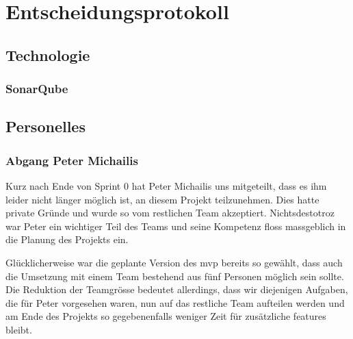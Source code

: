 \documentclass[../main.tex]{subfiles}
\begin{document}
    \section{Entscheidungsprotokoll}
    
    \subsection{Technologie}
    
    \subsubsection{SonarQube}
    \par {}
    
    \subsection{Personelles}
    \subsubsection{Abgang Peter Michailis}
    \par Kurz nach Ende von Sprint 0 hat Peter Michailis uns mitgeteilt, dass es ihm leider nicht länger möglich ist, an diesem Projekt teilzunehmen. Dies hatte private Gründe und wurde so vom restlichen Team akzeptiert. Nichtsdestotroz war Peter ein wichtiger Teil des Teams und seine Kompetenz floss massgeblich in die Planung des Projekts ein. 
    \par Glücklicherweise war die geplante Version des \gls{mvp} bereits so gewählt, dass auch die Umsetzung mit einem Team bestehend aus fünf Personen möglich sein sollte. Die Reduktion der Teamgrösse bedeutet allerdings, dass wir diejenigen Aufgaben, die für Peter vorgesehen waren, nun auf das restliche Team aufteilen werden und am Ende des Projekts so gegebenenfalls weniger Zeit für zusätzliche \glspl{feature} bleibt.
\end{document}
